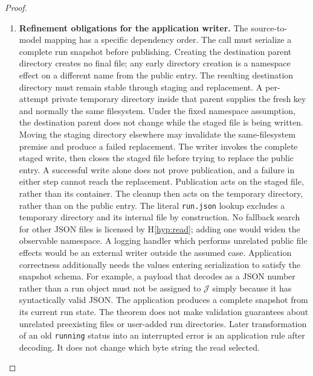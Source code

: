 \documentclass[12pt]{article}
\newcommand{\Valid}{\mathcal{J}}
\begin{document}
\begin{proof}
\begin{enumerate}
\item \textbf{Refinement obligations for the application writer.}
The source-to-model mapping has a specific dependency order.
The call must serialize a complete run snapshot before publishing.
Creating the destination parent directory creates no final
file; any early directory creation is a namespace effect
on a different name from the public entry.
The resulting destination directory must remain stable
through staging and replacement.
A per-attempt private temporary directory inside that parent
supplies the fresh key and normally the same filesystem.
Under the fixed namespace assumption, the destination parent
does not change while the staged file is being written.
Moving the staging directory elsewhere may invalidate
the same-filesystem premise and produce a failed replacement.
The writer invokes the complete staged write, then closes the
staged file before trying to replace the public entry.
A successful write alone does not prove publication,
and a failure in either step cannot reach the replacement.
Publication acts on the staged file, rather than its container.
The cleanup then acts on the temporary directory, rather than
on the public entry.
The literal \texttt{run.json} lookup excludes a temporary
directory and its internal file by construction.
No fallback search for other JSON files is licensed by
H\ref{hyp:read}; adding one would widen the observable namespace.
A logging handler which performs unrelated public file effects
would be an external writer outside the assumed case.
Application correctness additionally needs the values entering
serialization to satisfy the snapshot schema.
For example, a payload that decodes as a JSON number rather
than a run object must not be assigned to $\Valid$ simply
because it has syntactically valid JSON.
The application produces a complete snapshot from its current
run state. The theorem does not make validation guarantees
about unrelated preexisting files or user-added run directories.
Later transformation of an old \texttt{running} status into
an interrupted error is an application rule after decoding.
It does not change which byte string the read selected.


\end{enumerate}
\end{proof}
\end{document}
